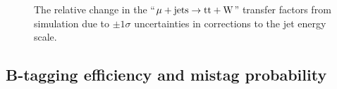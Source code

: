\begin{figure}[!h]
{  } \\
   ~
   \\
  \caption{\label{fig:tfSyst_jec_muToTtw} The relative change in the
    ``$\mu + \textrm{jets} \rightarrow \mathrm{tt+W}$'' transfer factors from
    simulation due to $\pm1\sigma$ uncertainties in corrections to the
    jet energy scale.  }
\end{figure}

\clearpage
\subsection{B-tagging efficiency and mistag probability}

